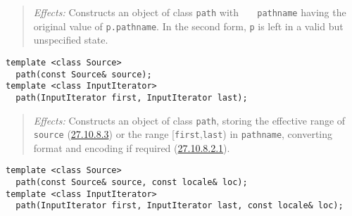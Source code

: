 \begin{quote}
\emph{Effects:} Constructs an object of class \texttt{path} with
\texttt{\ \ \ pathname} having the original value of
\texttt{p.pathname}. In the second form, \texttt{p} is left in a valid
but unspecified state.
\end{quote}

\begin{verbatim}
template <class Source>
  path(const Source& source);
template <class InputIterator>
  path(InputIterator first, InputIterator last);
\end{verbatim}

\begin{quote}
\emph{Effects:} Constructs an object of class \texttt{path}, storing the
effective range of \texttt{source} (\hyperref[path.req]{27.10.8.3}) or
the range {[}\texttt{first},\texttt{last}) in \texttt{pathname},
converting format and encoding if required
(\hyperref[path.fmt.cvt]{27.10.8.2.1}).
\end{quote}

\begin{verbatim}
template <class Source>
  path(const Source& source, const locale& loc);
template <class InputIterator>
  path(InputIterator first, InputIterator last, const locale& loc);
\end{verbatim}

